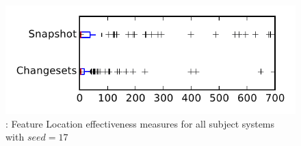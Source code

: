 
\begin{figure}
\centering
\includegraphics[height=0.4\textheight]{figures/flt_seed/rq1_tiny_17}
\caption{\rone: Feature Location effectiveness measures for all subject systems with $seed=17$}
\label{fig:flt_seed:rq1:tiny}
\end{figure}
